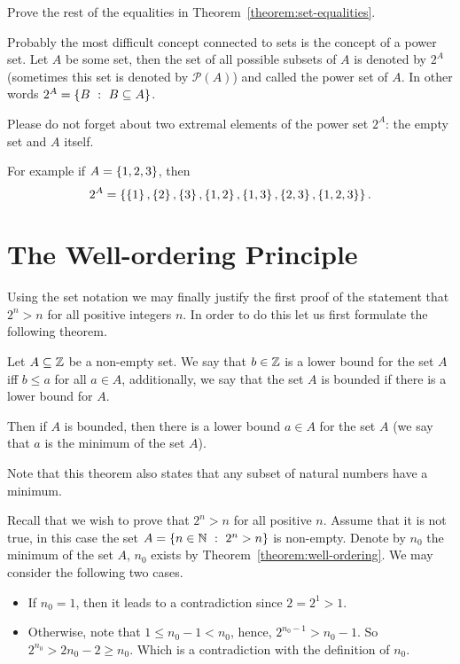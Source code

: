 \begin{exercise}
\label{exercise:set-equalities}
  Prove the rest of the equalities in Theorem~\ref{theorem:set-equalities}.
\end{exercise}

Probably the most difficult concept connected to sets is
the concept of a power set. Let $A$ be some set, then the set of
all possible subsets of $A$ is denoted by $2^A$ (sometimes this set is denoted
by $\mathcal{P}(A)$) and called the power set of $A$. In other words $2^A =
\set[B \subseteq A]{B}$.


\begin{warning}
  Please do not forget about two extremal elements of the power set $2^A$: the
  empty set and $A$ itself.
\end{warning}

\noindent For example if $A = \set{1, 2, 3}$, then $$2^A = \set{\set{1},
\set{2}, \set{3}, \set{1, 2}, \set{1, 3}, \set{2, 3}, \set{1, 2, 3}}.$$

\section{The Well-ordering Principle}
Using the set notation we may finally justify the first proof of the statement
that $2^n > n$ for all positive integers $n$. In order to do this let us first
formulate the following theorem.
\begin{theorem}
\label{theorem:well-ordering}
  Let $A \subseteq \mathbb{Z}$ be a non-empty set. We say that $b \in \mathbb{Z}$ is a lower
  bound for the set $A$ iff $b \le a$ for all $a \in A$, additionally, we say
  that the set $A$ is bounded if there is a lower bound for $A$.

  Then if $A$ is bounded, then there is a lower bound $a \in A$ for the set $A$
  (we say that $a$ is the minimum of the set $A$).
\end{theorem}
Note that this theorem also states that any subset of natural numbers have a
minimum.

Recall that we wish to prove that $2^n > n$ for all positive $n$.
Assume that it is not true, in this case the set
$A = \set[2^n > n]{n \in \N}$ is non-empty. Denote by $n_0$ the minimum of the
set $A$, $n_0$ exists by Theorem~\ref{theorem:well-ordering}. We may consider
the following two cases.
\begin{itemize}
  \item If $n_0 = 1$, then it leads to a contradiction since $2 = 2^1 > 1$.
  \item Otherwise, note that $1 \le n_0 - 1 < n_0$, hence,
    $2^{n_0 - 1} > n_0 - 1$. So $2^{n_0} > 2n_0 - 2 \ge n_0$. Which is a
    contradiction with the definition of $n_0$.
\end{itemize}


